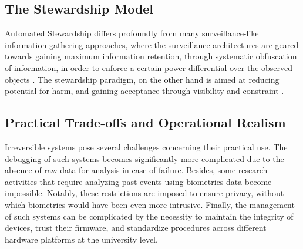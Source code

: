 \documentclass[conference]{IEEEtran}
\begin{document}
\subsection{The Stewardship Model}
Automated Stewardship differs profoundly from many surveillance-like information gathering approaches, where the surveillance architectures are geared towards gaining maximum information retention, through systematic obfuscation of information, in order to enforce a certain power differential over the observed objects \cite{b10}. The stewardship paradigm, on the other hand is aimed at reducing potential for harm, and gaining acceptance through visibility and constraint \cite{b15}.

\subsection{Practical Trade-offs and Operational Realism}
Irreversible systems pose several challenges concerning their practical use. The debugging of such systems becomes significantly more complicated due to the absence of raw data for analysis in case of failure. Besides, some research activities that require analyzing past events using biometrics data become impossible. Notably, these restrictions are imposed to ensure privacy, without which biometrics would have been even more intrusive. Finally, the management of such systems can be complicated by the necessity to maintain the integrity of devices, trust their firmware, and standardize procedures across different hardware platforms at the university level.
\end{document}
